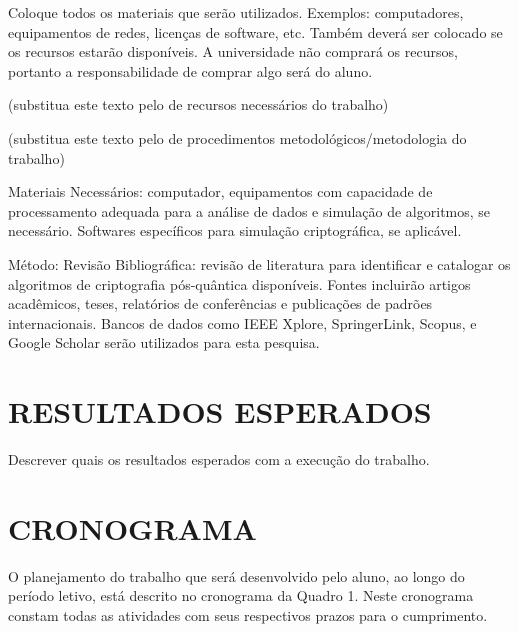 Coloque todos os materiais que serão utilizados. Exemplos: computadores, equipamentos de redes, licenças de software, etc. Também deverá ser colocado se os recursos estarão disponíveis. A universidade não comprará os recursos, portanto a responsabilidade de comprar algo será do aluno.

(substitua este texto pelo de recursos necessários do trabalho)

(substitua este texto pelo de procedimentos metodológicos/metodologia do trabalho)

{\color{blue}
	Materiais Necessários: computador, equipamentos com capacidade de processamento adequada para a análise de dados e simulação de algoritmos, se necessário. Softwares específicos para simulação criptográfica, se aplicável.
	
	Método: Revisão Bibliográfica: revisão de literatura para identificar e catalogar os algoritmos de criptografia pós-quântica disponíveis. Fontes incluirão artigos acadêmicos, teses, relatórios de conferências e publicações de padrões internacionais. Bancos de dados como IEEE Xplore, SpringerLink, Scopus, e Google Scholar serão utilizados para esta pesquisa.
}

\section{RESULTADOS ESPERADOS}
\label{sec:resultados}

Descrever quais os resultados esperados com a execução do trabalho. 


\section{CRONOGRAMA}
\label{sec:planejamento}
O planejamento do trabalho que será desenvolvido pelo aluno, ao longo do período letivo, está descrito no cronograma da Quadro 1. Neste cronograma constam todas as atividades com seus respectivos prazos para o cumprimento.

